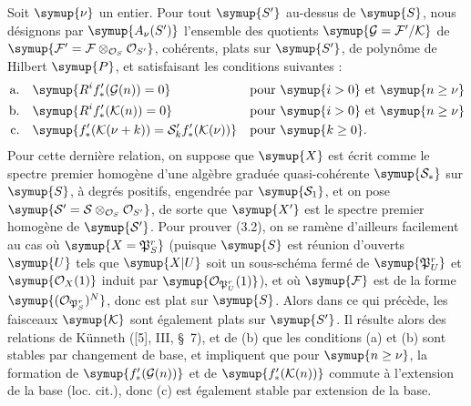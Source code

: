 Soit $\symup{\nu}$ un entier. Pour tout $\symup{S'}$ au-dessus de $\symup{S}$, nous désignons par
$\symup{A_\nu(S')}$ l'ensemble des quotients
$\symup{\mathcal G=\mathcal F'/\mathcal K}$ de
$\symup{\mathcal F'=\mathcal F\otimes_{\mathcal O_S}\mathcal O_{S'}}$, cohérents,
plats sur $\symup{S'}$, de polynôme de Hilbert $\symup{P}$, et satisfaisant les conditions suivantes :
\begin{align*}
\text{a.}\quad &\symup{R^if^\prime_*(\mathcal G(n))=0} &&\text{pour $\symup{i>0}$ et $\symup{n\geq\nu}$}\\
\text{b.}\quad &\symup{R^if^\prime_*(\mathcal K(n))=0} &&\text{pour $\symup{i>0}$ et $\symup{n\geq\nu}$}\\
\text{c.}\quad &\symup{f^\prime_*(\mathcal K(\nu+k))=\mathcal S^\prime_k f^\prime_*(\mathcal K(\nu))} &&\text{pour $\symup{k\geq0}$}.
\end{align*}
Pour cette dernière relation, on suppose que $\symup{X}$ est écrit comme le spectre
premier homogène d'une algèbre graduée quasi-cohérente $\symup{\mathcal S_*}$ sur $\symup{S}$,
à degrés positifs, engendrée par $\symup{\mathcal S_1}$, et on pose
$\symup{\mathcal S' =\mathcal S\otimes_{\mathcal O_S}\mathcal O_{S'}}$, de sorte
que $\symup{X'}$ est le spectre premier homogène de $\symup{\mathcal S'}$. Pour prouver
(3.2), on se ramène d'ailleurs facilement au cas où $\symup{X=\mathfrak P^r_S}$ (puisque
$\symup{S}$ est réunion d'ouverts $\symup{U}$ tels que $\symup{X|U}$ soit un sous-schéma fermé de
$\symup{\mathfrak P^r_U}$ et $\symup{\mathcal O_X(1)}$ induit par
$\symup{\mathcal O_{\mathfrak P^r_U}(1)}$), et où $\symup{\mathcal F}$ est de la forme
$\symup{(\mathcal O_{\mathfrak P^r_S})^{N}}$, donc est plat sur $\symup{S}$. Alors dans ce qui
précède, les faisceaux $\symup{\mathcal K}$ sont également plats sur $\symup{S'}$. Il résulte
alors des relations de Künneth ([5], III, \S~7), et de (b) que les conditions (a) et (b)
sont stables par changement de base, et impliquent que pour $\symup{n\geq\nu}$, la
formation de $\symup{f'_*(\mathcal G(n))}$ et de $\symup{f'_*(\mathcal K(n))}$ commute à
l'extension de la base (loc. cit.), donc (c) est également stable par extension
de la base.

